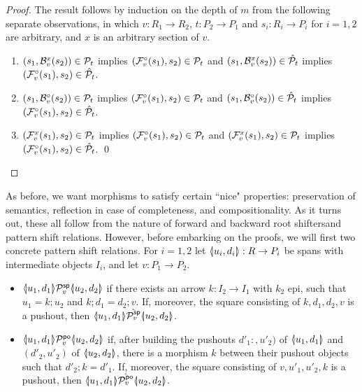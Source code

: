 %
\begin{proof}
The result follows by induction on the depth of $m$ from the following separate observations, in which $v:R_1\to R_2$, $t:P_2\to P_1$ and $s_i:R_i\to P_i$ for $i=1,2$ are arbitrary, and $x$ is an arbitrary section of $v$.
\begin{enumerate}
\item $(s_1,\mathcal{B}_v^x(s_2))\in \mathcal{P}_t$ implies $(\mathcal{F}_v^\circ(s_1),s_2)\in \mathcal{P}_t$ and $(s_1,\mathcal{B}_v^x(s_2))\in \hat{\mathcal{P}}_t$ implies $(\mathcal{F}_v^\circ(s_1),s_2)\in \hat{\mathcal{P}}_t$.

\item $(s_1,\mathcal{B}_v^\circ(s_2))\in \mathcal{P}_t$ implies $(\mathcal{F}_v^\circ(s_1),s_2)\in \mathcal{P}_t$ and $(s_1,\mathcal{B}_v^\circ(s_2))\in \hat{\mathcal{P}}_t$ implies $(\mathcal{F}_v^\circ(s_1),s_2)\in \hat{\mathcal{P}}_t$.

\item $(\mathcal{F}_v^x(s_1),s_2)\in \mathcal{P}_t$ implies $(\mathcal{F}_v^\circ(s_1),s_2)\in \mathcal{P}_t$ and $(\mathcal{F}_v^x(s_1),s_2)\in \mathcal{P}_t$ implies $(\mathcal{F}_v^\circ(s_1),s_2)\in \hat{\mathcal{P}}_t$.
\qed
\end{enumerate}
\end{proof}

%
As before, we want morphisms to satisfy certain ``nice" properties: preservation of semantics, reflection in case of completeness, and compositionality. As it turns out, these all follow from the nature of forward and backward root shiftersand pattern shift relations. However, before embarking on the proofs, we will first two concrete pattern shift relations. For $i=1,2$ let $\spanof{u_i}{d_i}:R\to P_i$ be spans with intermediate objects $I_i$, and let $v:P_1\to P_2$.

\begin{itemize}
\item $\spanof{u_1}{d_1}\cPsp v\spanof{u_2}{d_2}$ if there exists an arrow $k:I_2\to I_1$ with $k_2$ epi, such that $u_1=k;u_2$ and $k;d_1=d_2;v$. If, moreover, the square consisting of $k,d_1,d_2,v$ is a pushout, then $\spanof{u_1}{d_1}\hat{\cPsp v} \spanof{u_2}{d_2}$.

\item $\spanof{u_1}{d_1}\cPpo v \spanof{u_2}{d_2}$ if, after building the pushouts $d'_1:,u'_2)$ of $\spanof{u_1}{d_1}$ and $(d'_2,u'_2)$ of $\spanof{u_2}{d_2}$, there is a morphism $k$ between their pushout objects such that $d'_2;k=d'_1$. If, moreover, the square consisting of $v,u'_1,u'_2,k$ is a pushout, then $\spanof{u_1}{d_1}\hat{\cPpo v} \spanof{u_2}{d_2}$.
\end{itemize}

